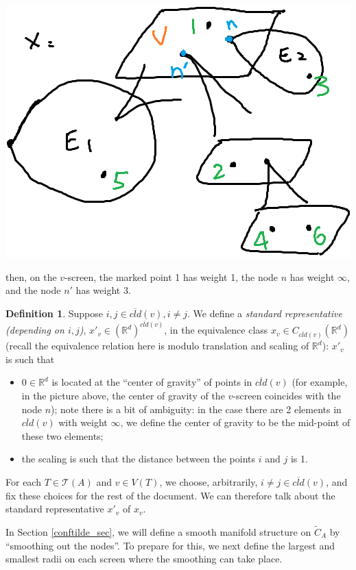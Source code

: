 \documentclass[11pt]{article}
\theoremstyle{definition}
\newtheorem{dfn}[thm]{Definition}
\theoremstyle{remark}
\def\wt#1{\widetilde{#1}}
\def\ov#1{\overline{#1}}
\def\R{\mathbb{R}}
\def\cT{\mathcal{T}}
\begin{document}
\includegraphics[scale=0.5]{ST2_fig}

then, on the $v$-screen, the marked point 1 has weight 1, the node $n$ has weight $\infty$, and the node $n'$ has weight 3.

\begin{dfn}\label{screennormalize_dfn}
Suppose $i,j\in \ov{cld}(v), i\neq j$. 
We define a {\it standard representative (depending on $i,j$)}, $x'_v\in (\R^d)^{\ov{cld}(v)}$, 
in the equivalence class $x_v\in C_{\ov{cld}(v)}(\R^d)$ (recall the equivalence relation here is modulo translation and scaling of $\R^d$):
$x'_v$ is such that 
\begin{itemize}
\item $0\in\R^d$ is located at the ``center of gravity'' of points in $\ov{cld}(v)$ (for example, in the picture above, the center of gravity of the $v$-screen coincides with the node $n$); note there is a bit of ambiguity: in the case there are 2 elements in $\ov{cld}(v)$ with weight $\infty$, we define the center of gravity to be the mid-point of these two elements; 

\item the scaling is such that the distance between the points $i$ and $j$ is 1. 
\end{itemize}
\end{dfn}

For each $T\in \cT(A)$ and $v\in V(T)$, we choose, arbitrarily, $i\neq j\in \ov{cld}(v)$, and fix these choices for the rest of the document. 
We can therefore talk about the standard representative $x'_v$ of $x_v$. 

In Section \ref{conftilde_sec}, we will define a smooth manifold structure on $\wt{C}_A$ by ``smoothing out the nodes''. To prepare for this, we next define the largest and smallest radii on each screen where the smoothing can take place. 
\end{document}
